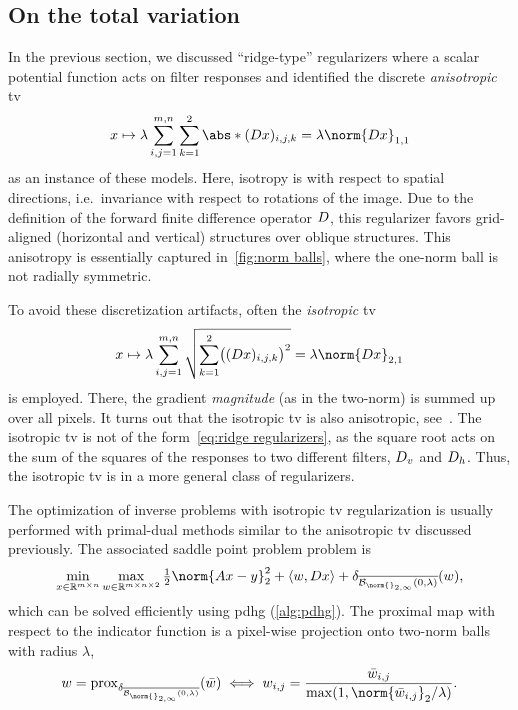 \subsection{On the total variation}%
\label{ssec:tv}
In the previous section, we discussed \enquote{ridge-type} regularizers where a scalar potential function acts on filter responses and identified the discrete \emph{anisotropic} \gls{tv}
\begin{equation}
	x \mapsto \lambda \sum_{i,j=\num{1}}^{m,n} \sum_{k=\num{1}}^{\num{2}} \abs*{(\DiffOp x)_{i,j,k}} = \lambda \norm{Dx}_{\num{1}, \num{1}}
\end{equation}
as an instance of these models.
Here, isotropy is with respect to spatial directions, i.e.\ invariance with respect to rotations of the image.
Due to the definition of the forward finite difference operator \( D \), this regularizer favors grid-aligned (horizontal and vertical) structures over oblique structures.
This anisotropy is essentially captured in~\cref{fig:norm balls}, where the one-norm ball is not radially symmetric.

To avoid these discretization artifacts, often the \emph{isotropic} \gls{tv}
\begin{equation}
	x \mapsto \lambda \sum_{i,j=\num{1}}^{m,n} \sqrt{\sum_{k=\num{1}}^{\num{2}} \bigl((\DiffOp x)_{i,j,k}\bigr)^{\num{2}}} = \lambda \norm{Dx}_{\num{2}, \num{1}}
\end{equation}
is employed.
There, the gradient \emph{magnitude} (as in the two-norm) is summed up over all pixels.
It turns out that the isotropic \gls{tv} is also anisotropic, see~\cite{condat_tv_2017}.
The isotropic \gls{tv} is not of the form~\cref{eq:ridge regularizers}, as the square root acts on the sum of the squares of the responses to two different filters, \( D_v \) and \( D_h \).
Thus, the isotropic \gls{tv} is in a more general class of regularizers.

The optimization of inverse problems with isotropic \gls{tv} regularization is usually performed with primal-dual methods similar to the anisotropic \gls{tv} discussed previously.
The associated saddle point problem problem is
\begin{equation}
	\min_{\Signal \in \R^{\Height \times \Width}} \max_{w \in \R^{\Height \times \Width \times \num{2}}} \Half\norm{\Forward\Signal - \Data}_{\num{2}}^{\num{2}} + \inprod{w}{\DiffOp\Signal} +  \IndicatorFunction{\Closure{\Ball{\norm{}_{\num{2},\infty}}{\num{0}}{\lambda}}}(w),
\end{equation}
which can be solved efficiently using \gls{pdhg} (\cref{alg:pdhg}).
The proximal map with respect to the indicator function is a pixel-wise projection onto two-norm balls with radius \( \lambda \),
\begin{equation}
	w = \prox_{\IndicatorFunction{\Closure{\Ball{\norm{}_{\num{2},\infty}}{\num{0}}{\lambda}}}}(\bar{w}) \iff w_{i,j} = \frac{\bar{w}_{i,j}}{\max(\num{1}, \norm{\bar{w}_{i,j}}_{\num{2}}/\lambda)}.
\end{equation}

